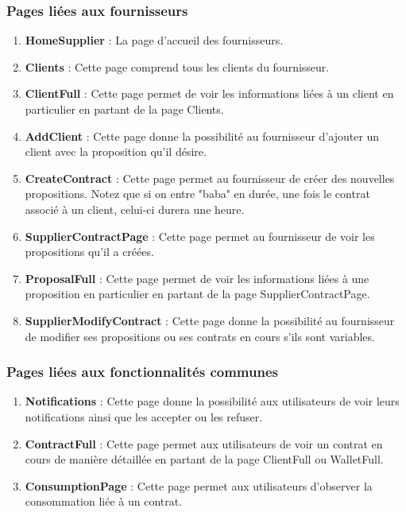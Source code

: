 \subsubsection{Pages liées aux fournisseurs}
\begin{enumerate}
\item \textbf{HomeSupplier} : \newline
La page d’accueil des fournisseurs.
\item \textbf{Clients} : \newline
Cette page comprend tous les clients du fournisseur.
\item \textbf{ClientFull} :  \newline
Cette page permet de voir les informations liées à un client en particulier en partant de la page Clients.
\item \textbf{AddClient} : \newline
Cette page donne la possibilité au fournisseur d’ajouter un client avec la proposition qu’il désire.
\item \textbf{CreateContract} :\newline
Cette page permet au fournisseur de créer des nouvelles propositions. \newline
Notez que si on entre "baba" en durée, une fois le contrat associé à un client, celui-ci durera une heure. 
\item \textbf{SupplierContractPage} :\newline
Cette page permet au fournisseur de voir les propositions qu’il a créées.
\item \textbf{ProposalFull} :\newline
Cette page permet de voir les informations liées à une proposition en particulier en partant de la page SupplierContractPage.
\item \textbf{SupplierModifyContract} :\newline
Cette page donne la possibilité au fournisseur de modifier ses propositions ou ses contrats en cours s’ils sont variables.
\end{enumerate} 

\subsubsection{Pages liées aux fonctionnalités communes}
\begin{enumerate}
\item \textbf{Notifications} :\newline
Cette page donne la possibilité aux utilisateurs de voir leurs notifications ainsi que les accepter ou les refuser.
\item \textbf{ContractFull} :\newline
Cette page permet aux utilisateurs de voir un contrat en cours de manière détaillée en partant de la page ClientFull ou WalletFull.
\item \textbf{ConsumptionPage} :\newline
Cette page permet aux utilisateurs d’observer la consommation liée à un contrat.
\end{enumerate} 

